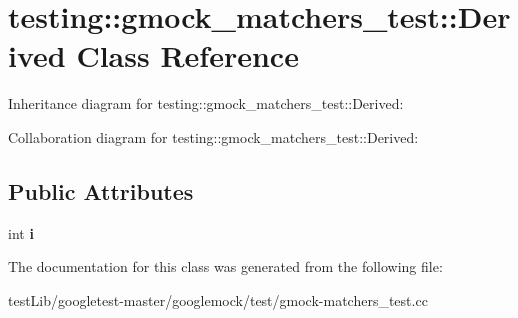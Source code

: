 \hypertarget{classtesting_1_1gmock__matchers__test_1_1Derived}{}\section{testing\+:\+:gmock\+\_\+matchers\+\_\+test\+:\+:Derived Class Reference}
\label{classtesting_1_1gmock__matchers__test_1_1Derived}


Inheritance diagram for testing\+:\+:gmock\+\_\+matchers\+\_\+test\+:\+:Derived\+:


Collaboration diagram for testing\+:\+:gmock\+\_\+matchers\+\_\+test\+:\+:Derived\+:
\subsection*{Public Attributes}
\begin{DoxyCompactItemize}
\item 
\mbox{\label{classtesting_1_1gmock__matchers__test_1_1Derived_a357d6747c44d7af7159fb5898a782f1b}} 
int {\bfseries i}
\end{DoxyCompactItemize}


The documentation for this class was generated from the following file\+:\begin{DoxyCompactItemize}
\item 
test\+Lib/googletest-\/master/googlemock/test/gmock-\/matchers\+\_\+test.\+cc\end{DoxyCompactItemize}
